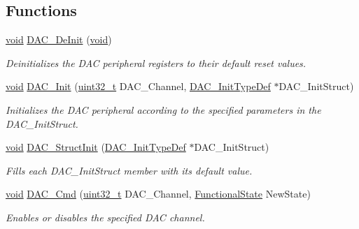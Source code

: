 \subsection*{Functions}
\begin{DoxyCompactItemize}
\item 
\hyperlink{usb__devapi_8h_afabf60e7f57651d6d595a02c75f07cd0}{void} \hyperlink{group___d_a_c___private___functions_ga1fae225204e1e049d6795319e99ba8bc}{D\+A\+C\+\_\+\+De\+Init} (\hyperlink{usb__devapi_8h_afabf60e7f57651d6d595a02c75f07cd0}{void})
\begin{DoxyCompactList}\small\item\em Deinitializes the D\+AC peripheral registers to their default reset values. \end{DoxyCompactList}\item 
\hyperlink{usb__devapi_8h_afabf60e7f57651d6d595a02c75f07cd0}{void} \hyperlink{group___d_a_c___private___functions_ga7c59850468ed4bf0659663fe495441da}{D\+A\+C\+\_\+\+Init} (\hyperlink{_p_e___types_8h_a33594304e786b158f3fb30289278f5af}{uint32\+\_\+t} D\+A\+C\+\_\+\+Channel, \hyperlink{struct_d_a_c___init_type_def}{D\+A\+C\+\_\+\+Init\+Type\+Def} $\ast$D\+A\+C\+\_\+\+Init\+Struct)
\begin{DoxyCompactList}\small\item\em Initializes the D\+AC peripheral according to the specified parameters in the D\+A\+C\+\_\+\+Init\+Struct. \end{DoxyCompactList}\item 
\hyperlink{usb__devapi_8h_afabf60e7f57651d6d595a02c75f07cd0}{void} \hyperlink{group___d_a_c___private___functions_gadfc270974d54cb5fa5f92556015c4046}{D\+A\+C\+\_\+\+Struct\+Init} (\hyperlink{struct_d_a_c___init_type_def}{D\+A\+C\+\_\+\+Init\+Type\+Def} $\ast$D\+A\+C\+\_\+\+Init\+Struct)
\begin{DoxyCompactList}\small\item\em Fills each D\+A\+C\+\_\+\+Init\+Struct member with its default value. \end{DoxyCompactList}\item 
\hyperlink{usb__devapi_8h_afabf60e7f57651d6d595a02c75f07cd0}{void} \hyperlink{group___d_a_c___private___functions_ga323e61530d7fa9396c3bce9edb61f733}{D\+A\+C\+\_\+\+Cmd} (\hyperlink{_p_e___types_8h_a33594304e786b158f3fb30289278f5af}{uint32\+\_\+t} D\+A\+C\+\_\+\+Channel, \hyperlink{agilefox_2library_2inc_2stm32f10x__type_8h_ac9a7e9a35d2513ec15c3b537aaa4fba1}{Functional\+State} New\+State)
\begin{DoxyCompactList}\small\item\em Enables or disables the specified D\+AC channel. \end{DoxyCompactList}\item 

\end{DoxyCompactItemize}
